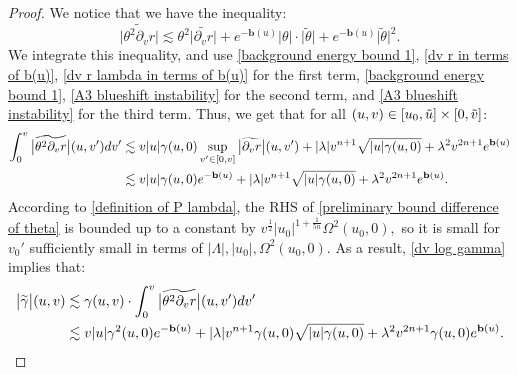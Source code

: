 \documentclass[11pt]{article}
\numberwithin{equation}{section}
\begin{document}
\begin{proof}
    We notice that we have the inequality:
    \[\big|\widetilde{\theta^2\partial_vr}\big|\lesssim\theta^2\big|\widetilde{\partial_vr}\big|+e^{-\mathbf{b}(u)}|\theta|\cdot\big|\widetilde{\theta}\big|+e^{-\mathbf{b}(u)}\big|\widetilde{\theta}\big|^2.\]
    We integrate this inequality, and use \eqref{background energy bound 1}, \eqref{dv r in terms of b(u)}, \eqref{dv r lambda in terms of b(u)} for the first term, \eqref{background energy bound 1}, \eqref{A3 blueshift instability} for the second term, and \eqref{A3 blueshift instability} for the third term. Thus, we get that for all $(u,v)\in[u_0,\Tilde{u}]\times[0,\Tilde{v}]$:
    \begin{align}\label{preliminary bound difference of theta}
        \int_0^v\big|\widetilde{\theta^2\partial_vr}\big|(u,v')dv'&\lesssim v|u|\gamma(u,0)\sup_{v'\in[0,v]}\big|\widetilde{\partial_vr}\big|(u,v')+|\lambda| v^{n+1}\sqrt{|u|\gamma(u,0)}+\lambda^2v^{2n+1}e^{\mathbf{b}(u)}\\
        &\lesssim v|u|\gamma(u,0)e^{-\mathbf{b}(u)}+|\lambda|v^{n+1}\sqrt{|u|\gamma(u,0)}+\lambda^2v^{2n+1}e^{\mathbf{b}(u)}.\notag
    \end{align}
    According to \eqref{definition of P lambda}, the RHS of \eqref{preliminary bound difference of theta} is bounded up to a constant by $v^{\frac{1}{2}}|u_0|^{1+\frac{1}{5n}}\Omega^2(u_0,0),$ so it is small for $v_0'$ sufficiently small in terms of $|\Lambda|,|u_0|,\Omega^2(u_0,0).$ As a result, \eqref{dv log gamma} implies that:
    \begin{align}\label{preliminary bound difference of gamma}
        \big|\widetilde{\gamma}\big|(u,v)&\lesssim \gamma(u,v)\cdot\int_0^v\big|\widetilde{\theta^2\partial_vr}\big|(u,v')dv'\\
        &\lesssim v|u|\gamma^2(u,0)e^{-\mathbf{b}(u)}+|\lambda|v^{n+1}\gamma(u,0)\sqrt{|u|\gamma(u,0)}+\lambda^2v^{2n+1}\gamma(u,0)e^{\mathbf{b}(u)}.\notag
    \end{align}
    

\end{proof}
\end{document}
